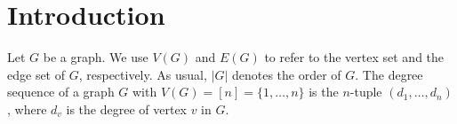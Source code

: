 \documentclass[11pt]{elsarticle}
\newtheorem{theorem}{Theorem}[section]
\begin{document}



%



\section{Introduction}\label{sec_intro}

Let $G$ be a graph. We use $V(G)$ and $E(G)$ to refer to the vertex set and the edge set of $G$, respectively. As usual, $|G|$ denotes the order of $G$.
The degree sequence of a graph $G$ with $V(G)=[n]=\{1,\dots,n\}$ is the $n$-tuple $(d_1,\dots,d_n)$, where $d_v$ is the degree of vertex $v$ in $G$. \\
\end{document}
